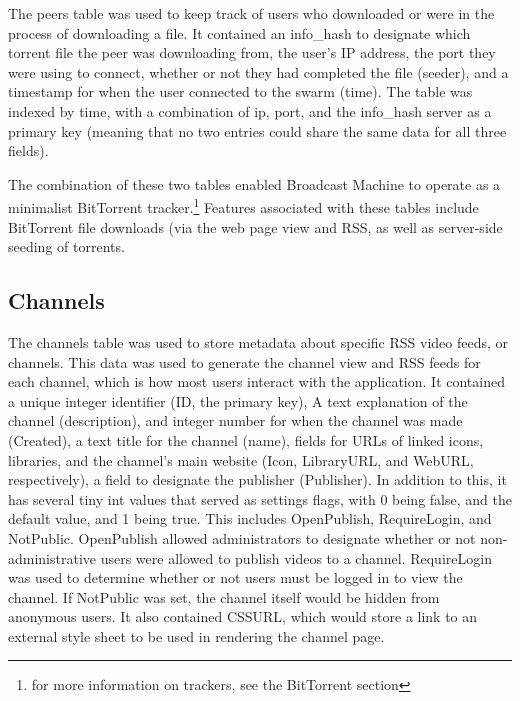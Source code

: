 \documentclass[a4paper,12pt]{report}
\begin{document}
	The peers table was used to keep track of users who downloaded or were in the process of downloading a file. It contained an info\_hash to designate which torrent file the peer was downloading from, the user's IP address, the port they were using to connect, whether or not they had completed the file (seeder), and a timestamp for when the user connected to the swarm (time). The table was indexed by time, with a combination of ip, port, and the info\_hash server as a primary key (meaning that no two entries could share the same data for all three fields). 

	The combination of these two tables enabled Broadcast Machine to operate as a minimalist BitTorrent tracker.\footnote{for more information on trackers, see the BitTorrent section} Features associated with these tables include BitTorrent file downloads (via the web page view and RSS, as well as server-side seeding of torrents.

\subsection{Channels}

	The channels table was used to store metadata about specific RSS video feeds, or channels. This data was used to generate the channel view and RSS feeds for each channel, which is how most users interact with the application. 
It contained a unique integer identifier (ID, the primary key), A text explanation of the channel (description), and integer number for when the channel was made (Created), a text title for the channel (name), fields for URLs of linked icons, libraries, and the channel's main website (Icon, LibraryURL, and WebURL, respectively), a field to designate the publisher (Publisher). In addition to this, it has several tiny int values that served as settings flags, with 0 being false, and the default value, and 1 being true. This includes OpenPublish, RequireLogin, and NotPublic. OpenPublish allowed administrators to designate whether or not non-administrative users were allowed to publish videos to a channel. RequireLogin was used to determine whether or not users must be logged in to view the channel. If NotPublic was set, the channel itself would be hidden from anonymous users.
It also contained CSSURL, which would store a link to an external style sheet to be used in rendering the channel page.
\end{document}
